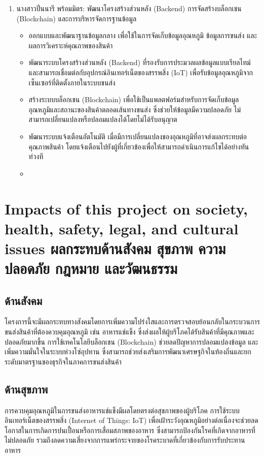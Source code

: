\begin{enumerate}
    
    \item นางสาวปิ่นนารี พร้อมมิตร: พัฒนาโครงสร้างส่วนหลัง (Backend) การจัดสร้างบล็อกเชน (Blockchain) และการบริหารจัดการฐานข้อมูล
    \begin{itemize}
        \item ออกแบบและพัฒนาฐานข้อมูลกลาง เพื่อใช้ในการจัดเก็บข้อมูลอุณหภูมิ ข้อมูลการขนส่ง และผลการวิเคราะห์คุณภาพของสินค้า
        \item พัฒนาระบบโครงสร้างส่วนหลัง (Backend) ที่รองรับการประมวลผลข้อมูลแบบเรียลไทม์ และสามารถเชื่อมต่อกับอุปกรณ์อินเทอร์เน็ตของสรรพสิ่ง (IoT) เพื่อรับข้อมูลอุณหภูมิจากเซ็นเซอร์ที่ติดตั้งภายในระบบขนส่ง
        \item สร้างระบบบล็อกเชน (Blockchain) เพื่อใช้เป็นแพลตฟอร์มสำหรับการจัดเก็บข้อมูลอุณหภูมิและสถานะของสินค้าตลอดเส้นทางขนส่ง ซึ่งช่วยให้ข้อมูลมีความปลอดภัย ไม่สามารถเปลี่ยนแปลงหรือปลอมแปลงได้โดยไม่ได้รับอนุญาต
        \item พัฒนาระบบแจ้งเตือนอัตโนมัติ เมื่อมีการเปลี่ยนแปลงของอุณหภูมิที่อาจส่งผลกระทบต่อคุณภาพสินค้า โดยแจ้งเตือนไปยังผู้ที่เกี่ยวข้องเพื่อให้สามารถดำเนินการแก้ไขได้อย่างทันท่วงที
        \item 
    \end{itemize}
    
\end{enumerate}

\section{\ifenglish%
Impacts of this project on society, health, safety, legal, and cultural issues
\else%
ผลกระทบด้านสังคม สุขภาพ ความปลอดภัย กฎหมาย และวัฒนธรรม
\fi}

\subsection{ด้านสังคม}
โครงการนี้จะมีผลกระทบทางสังคมโดยการเพิ่มความโปร่งใสและการตรวจสอบย้อนกลับในกระบวนการขนส่งสินค้าที่ต้องควบคุมอุณหภูมิ เช่น อาหารแช่แข็ง ซึ่งส่งผลให้ผู้บริโภคได้รับสินค้าที่มีคุณภาพและปลอดภัยมากขึ้น การใช้เทคโนโลยีบล็อกเชน (Blockchain) ช่วยลดปัญหาการปลอมแปลงข้อมูล และเพิ่มความมั่นใจในระบบห่วงโซ่อุปทาน ซึ่งสามารถช่วยส่งเสริมการพัฒนาเศรษฐกิจในท้องถิ่นและยกระดับมาตรฐานของธุรกิจในภาคการขนส่งสินค้า

\subsection{ด้านสุขภาพ}
การควบคุมอุณหภูมิในการขนส่งอาหารแช่แข็งมีผลโดยตรงต่อสุขภาพของผู้บริโภค การใช้ระบบอินเทอร์เน็ตของสรรพสิ่ง (Internet of Things: IoT) เพื่อเฝ้าระวังอุณหภูมิอย่างต่อเนื่องจะช่วยลดโอกาสในการเกิดการปนเปื้อนหรือการเสื่อมสภาพของอาหาร ซึ่งสามารถป้องกันโรคที่เกิดจากอาหารที่ไม่ปลอดภัย รวมถึงลดความเสี่ยงจากการแพร่กระจายของโรคระบาดที่เกี่ยวข้องกับการรับประทานอาหาร

